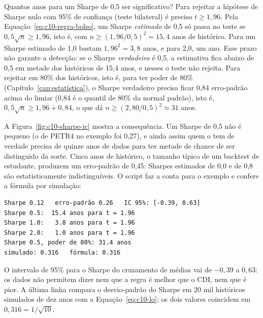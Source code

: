\begin{exemplo}{Quantos anos para um Sharpe de 0,5 ser significativo?}
Para rejeitar a hipótese de Sharpe nulo com 95\% de confiança (teste bilateral) é preciso $t \ge 1,96$. Pela Equação~\eqref{eq:c10-regra-bolso}, um Sharpe \emph{estimado} de 0,5 só passa no teste se $0,5\sqrt{n} \ge 1,96$, isto é, com $n \ge (1,96/0,5)^2 = 15,4$ anos de histórico. Para um Sharpe estimado de 1,0 bastam $1,96^2 = 3,8$ anos, e para 2,0, um ano. Esse prazo não garante a detecção: se o Sharpe \emph{verdadeiro} é 0,5, a estimativa fica abaixo de 0,5 em metade dos históricos de 15,4 anos, e nesses o teste não rejeita. Para rejeitar em 80\% dos históricos, isto é, para ter poder de 80\% (Capítulo~\ref{cap:estatistica}), o Sharpe verdadeiro precisa ficar 0,84 erro-padrão acima do limiar (0,84 é o quantil de 80\% da normal padrão), isto é, $0,5\sqrt{n} \ge 1,96 + 0,84$, o que dá $n \ge (2,80/0,5)^2 \approx 31$ anos.
\end{exemplo}


A Figura~\ref{fig:c10-sharpe-ic} mostra a consequência. Um Sharpe de 0,5 não é pequeno (o de PETR4 no exemplo foi 0,27), e ainda assim quem o tem de verdade precisa de quinze anos de dados para ter metade de chance de ser distinguido da sorte. Cinco anos de histórico, o tamanho típico de um backtest de estudante, produzem um erro-padrão de 0,45: Sharpes estimados de 0,0 e de 0,8 são estatisticamente indistinguíveis. O script  faz a conta para o exemplo e confere a fórmula por simulação:

\begin{lstlisting}[style=saida]
Sharpe 0.12   erro-padrão 0.26   IC 95%: [-0.39, 0.63]
Sharpe 0.5:  15.4 anos para t = 1.96
Sharpe 1.0:   3.8 anos para t = 1.96
Sharpe 2.0:   1.0 anos para t = 1.96
Sharpe 0.5, poder de 80%: 31.4 anos
simulado: 0.316   fórmula: 0.316
\end{lstlisting}

O intervalo de 95\% para o Sharpe do cruzamento de médias vai de $-0,39$ a $0,63$: os dados não permitem dizer nem que a regra é melhor que o CDI, nem que é pior. A última linha compara o desvio-padrão do Sharpe em 20 mil históricos simulados de dez anos com a Equação~\eqref{eq:c10-lo}; os dois valores coincidem em $0,316 = 1/\sqrt{10}$.

